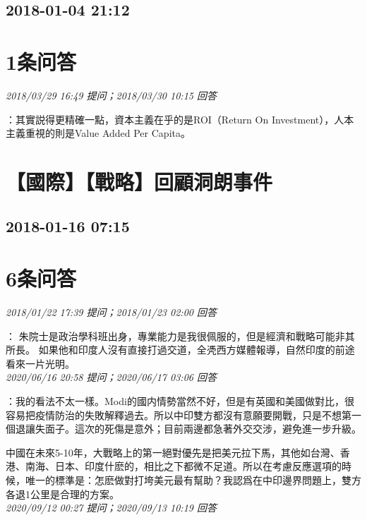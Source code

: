 \documentclass[twocolumn]{ctexart}
\begin{document}
\subsection{2018-01-04 21:12}


\section{1条问答}

\textit{\hfill\noindent\small 2018/03/29 16:49 提问；2018/03/30 10:15 回答}

：其實説得更精確一點，資本主義在乎的是ROI（Return On Investment），人本主義重視的則是Value Added Per Capita。
\\


\section{【國際】【戰略】回顧洞朗事件}
\subsection{2018-01-16 07:15}


\section{6条问答}

\textit{\hfill\noindent\small 2018/01/22 17:39 提问；2018/01/23 02:00 回答}

：
朱院士是政治學科班出身，專業能力是我很佩服的，但是經濟和戰略可能非其所長。
如果他和印度人沒有直接打過交道，全凴西方媒體報導，自然印度的前途看來一片光明。
\\

\textit{\hfill\noindent\small 2020/06/16 20:58 提问；2020/06/17 03:06 回答}

：我的看法不太一樣。Modi的國内情勢當然不好，但是有英國和美國做對比，很容易把疫情防治的失敗解釋過去。所以中印雙方都沒有意願要開戰，只是不想第一個退讓失面子。這次的死傷是意外；目前兩邊都急著外交交涉，避免進一步升級。

中國在未來5-10年，大戰略上的第一絕對優先是把美元拉下馬，其他如台灣、香港、南海、日本、印度什麽的，相比之下都微不足道。所以在考慮反應選項的時候，唯一的標準是：怎麽做對打垮美元最有幫助？我認爲在中印邊界問題上，雙方各退1公里是合理的方案。
\\

\textit{\hfill\noindent\small 2020/09/12 00:27 提问；2020/09/13 10:19 回答}
\end{document}
